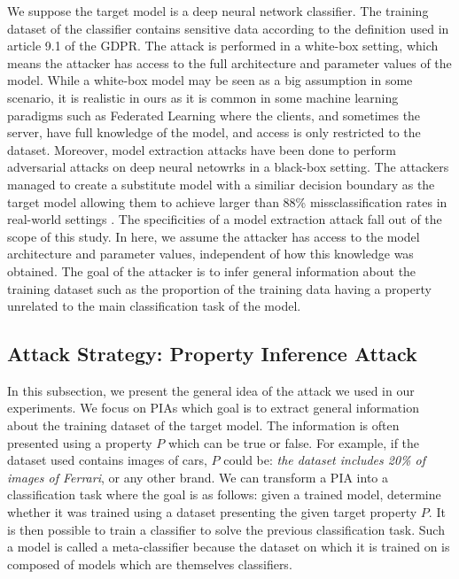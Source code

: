\documentclass[11pt]{article}
\begin{document}
We suppose the target model is a deep neural network classifier. The training dataset of the classifier contains sensitive data according to the definition used in article 9.1 of the GDPR. The attack is performed in a white-box setting, which means the attacker has access to the full architecture and parameter values of the model. While a white-box model may be seen as a big assumption in some scenario, it is realistic in ours as it is common in some machine learning paradigms such as Federated Learning \cite{shokri2015privacy} where the clients, and sometimes the server, have full knowledge of the model, and access is only restricted to the dataset. Moreover, model extraction attacks have been done to perform adversarial attacks on deep neural netowrks in a black-box setting. The attackers managed to create a substitute model with a similiar decision boundary as the target model allowing them to achieve larger than 88\% missclassification rates in real-world settings \cite{DBLP:journals/corr/PapernotMGJCS16}. The specificities of a model extraction attack fall out of the scope of this study. In here, we assume the attacker has access to the model architecture and parameter values, independent of how this knowledge was obtained. The goal of the attacker is to infer general information about the training dataset such as the proportion of the training data having a property unrelated to the main classification task of the model.

\subsection{Attack Strategy: Property Inference Attack}
In this subsection, we present the general idea of the attack we used in our experiments. We focus on PIAs which goal is to extract general information about the training dataset of the target model. The information is often presented using a property $P$ which can be true or false. For example, if the dataset used contains images of cars, $P$ could be: \textit{the dataset includes 20\% of images of Ferrari}, or any other brand. We can transform a PIA into a classification task where the goal is as follows: given a trained model, determine whether it was trained using a dataset presenting the given target property $P$. It is then possible to train a classifier to solve the previous classification task. Such a model is called a meta-classifier because the dataset on which it is trained on is composed of models which are themselves classifiers.
\end{document}
